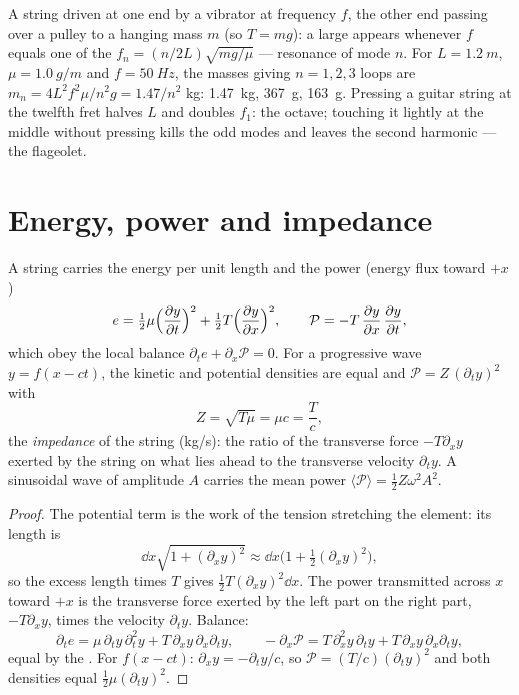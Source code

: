 \begin{example}\label{ex:b2:waves-on-strings:melde}
A string driven at one end by a vibrator at frequency $f$, the other end
passing over a pulley to a hanging mass $m$ (so $T = mg$): a large
 appears whenever $f$ equals one of the $f_n = (n/2L)
\sqrt{mg/\mu}$ --- resonance of mode $n$. For $L = \qty{1.2}{m}$, $\mu =
\qty{1.0}{g/m}$ and $f = \qty{50}{Hz}$, the masses giving $n = 1, 2, 3$ loops
are $m_n = 4L^2f^2\mu/n^2g = 1.47/n^2$ kg: \qty{1.47}{kg}, \qty{367}{g}, \qty{163}{g}.
Pressing a guitar string at the twelfth fret halves $L$ and doubles
$f_1$: the octave; touching it lightly at the middle without pressing
kills the odd modes and leaves the second harmonic --- the flageolet.
\end{example}

\section{Energy, power and impedance}

\begin{proposition}\label{prop:b2:waves-on-strings:energy}
A string carries the energy per unit length and the power (energy
flux toward $+x$)
\[
e = \tfrac12\mu\Bigl(\frac{\partial y}{\partial t}\Bigr)^2 + \tfrac12T\Bigl(\frac{\partial y}{\partial x}\Bigr)^2 ,
\qquad
\mathcal P = -T\,\frac{\partial y}{\partial x}\,\frac{\partial y}{\partial t} ,
\]
which obey the local balance $\partial_te + \partial_x\mathcal P = 0$. For a
progressive wave $y = f(x - ct)$, the kinetic and potential densities are
equal and $\mathcal P = Z\,(\partial_ty)^2$ with
\[
Z = \sqrt{T\mu} = \mu c = \frac Tc ,
\]
the \emph{impedance} of the string (\unit{kg/s}): the ratio of the
transverse force $-T\partial_xy$ exerted by the string on what lies ahead
to the transverse velocity $\partial_ty$. A sinusoidal wave of amplitude $A$
carries the mean power $\langle\mathcal P\rangle = \tfrac12Z\omega^2A^2$.
\end{proposition}

\begin{proof}
The potential term is the work of the tension stretching the element:
its length is
\[
\dd x\sqrt{1 + (\partial_xy)^2} \approx \dd x\bigl(1 + \tfrac12(\partial_xy)^2\bigr) ,
\]
so the excess length times $T$ gives $\tfrac12T(\partial_xy)^2\dd x$. The power
transmitted across $x$ toward $+x$ is the transverse force exerted by
the left part on the right part, $-T\partial_xy$, times the velocity
$\partial_ty$. Balance:
\[
\partial_te = \mu\,\partial_ty\,\partial_t^2y + T\,\partial_xy\,\partial_x\partial_ty ,
\qquad
-\partial_x\mathcal P = T\,\partial_x^2y\,\partial_ty + T\,\partial_xy\,\partial_x\partial_ty ,
\]
equal by the . For $f(x - ct)$: $\partial_xy = -\partial_ty/c$, so $\mathcal P = (T/c)
(\partial_ty)^2$ and both densities equal $\tfrac12\mu(\partial_ty)^2$.
\end{proof}

